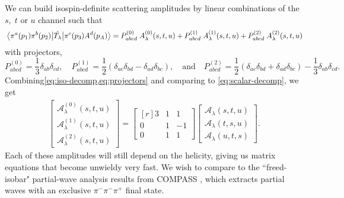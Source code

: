 \documentclass[10pt, aps,prd,amsmath,amssymb,superscriptaddress,onecolumn,
nofootinbib,showpacs,preprintnumbers]{revtex4-1}
\begin{document}
We can build isospin-definite scattering amplitudes by linear combinations of the \(s, \; t \text{ or } u\) channel such that
	\begin{equation}\label{eq:iso-decomp}
	  \mel{\pi^a(p_1)\pi^b(p_2)}{\hat{T_\lambda}}{\pi^c(p_3)A^d(p_A)} = P^{(0)}_{abcd} \; A_\lambda^{(0)}(s,t,u) + P^{(1)}_{abcd}  \; A_\lambda^{(1)}(s,t,u) +  P^{(2)}_{abcd} \; A_\lambda^{(2)}(s,t,u)
	\end{equation}
with projectors,
	\begin{equation} \label{eq:projectors}
	P^{(0)}_{abcd} = \frac{1}{3}\delta_{ab}\delta_{cd},  \quad P^{(1)}_{abcd} = \frac{1}{2}(\delta_{ac}\delta_{bd}-\delta_{ad}\delta_{bc}),  \quad \textrm{and} \quad   P^{(2)}_{abcd} = \frac{1}{2}
	(\delta_{ac}\delta_{bd} + \delta_{ad}\delta_{bc}) - \frac{1}{3} \delta_{ab}\delta_{cd}.
	\end{equation}
Combining\cref{eq:iso-decomp,eq:projectors} and comparing to \cref{eq:scalar-decomp}, we get
    \begin{align} \label{eq:matrix}
      \begin{bmatrix}
      \mathcal{A}_\lambda^{(0)}(s,t,u) \\ \mathcal{A}_\lambda^{(1)} (s,t,u) \\ \mathcal{A}_\lambda^{(2)}(s,t,u)
      \end{bmatrix}
    =
      \begin{bmatrix*}[r]
        3 & 1 & 1 \\ 	0 & 1 & -1 \\ 0 & 1 & 1
      \end{bmatrix*}
      \begin{bmatrix}
      \mathcal{A}_\lambda(s,t,u) \\ \mathcal{A}_\lambda(t,s,u) \\ \mathcal{A}_\lambda(u,t,s)
      \end{bmatrix}.
    \end{align}
 Each of these amplitudes will still depend on the helicity, giving us matrix equations that become unwieldy very fast. We wish to compare to the ``freed-isobar" partial-wave analysis results from COMPASS \cite{COMPASS-Swave,Krinner:2017vch}, which extracts partial waves with an exclusive \(\pi^-\pi^-\pi^+\) final state.
\end{document}
